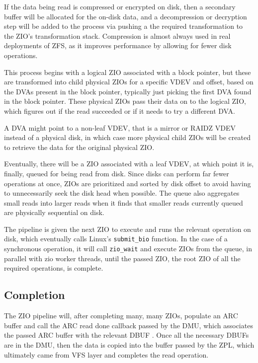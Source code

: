 If the data being read is compressed or encrypted on disk, then a secondary buffer will be allocated for the on-disk data,
and a decompression or decryption step will be added to the process via pushing a the required transformation 
to the ZIO's transformation stack.
Compression is almost always used in real deployments of ZFS, as it improves performance by allowing for fewer disk operations.

This process begins with a logical ZIO associated with a block pointer, but these are transformed into
child physical ZIOs for a specific VDEV and offset, based on the DVAs present in the block pointer,
typically just picking the first DVA found in the block pointer.
These physical ZIOs pass their data on to the logical ZIO, 
which figures out if the read succeeded or if it needs to try a different DVA.

A DVA might point to a non-leaf VDEV, that is a mirror or RAIDZ VDEV instead of a physical disk, 
in which case more physical child ZIOs will be created to retrieve the data for the original physical ZIO.

Eventually, there will be a ZIO associated with a leaf VDEV, at which point it is, finally, queued for being read from disk.
Since disks can perform far fewer operations at once, ZIOs are prioritized and sorted by disk offset to avoid having to 
unnecessarily seek the disk head when possible.
The queue also aggregates small reads into larger reads when it finds that smaller reads currently queued are physically sequential on disk.

The pipeline is given the next ZIO to execute and runs the relevant operation on disk, 
which eventually calls Linux's \texttt{submit\_bio} function.
In the case of a synchronous operation, it will call \texttt{zio\_wait} and execute ZIOs from the queue, in parallel with zio worker threads,
until the passed ZIO, the root ZIO of all the required operations, is complete.

\subsection{Completion}
The ZIO pipeline will, after completing many, many ZIOs, populate an ARC buffer and call the ARC read done callback passed by the DMU, 
which associates the passed ARC buffer with the relevant DBUF \cite{ahrens_read_write,zfs}.
Once all the necessary DBUFs are in the DMU, then the data is copied into the buffer passed by the ZPL, which ultimately came from VFS layer and completes the read operation.

